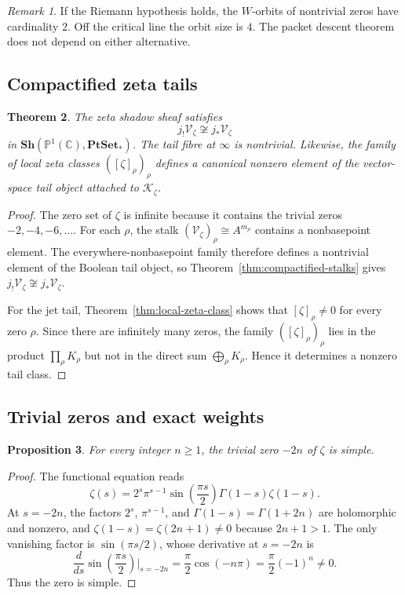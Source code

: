 \documentclass[11pt,a4paper]{article}
\newtheorem{theorem}{Theorem}[section]
\newtheorem{proposition}[theorem]{Proposition}
\theoremstyle{definition}
\theoremstyle{remark}
\newtheorem{remark}[theorem]{Remark}
\newcommand{\CC}{\mathbb C}
\newcommand{\PP}{\mathbb P}
\newcommand{\PtSet}{\mathbf{PtSet}_*}
\newcommand{\Vz}{\mathcal V_\zeta}
\newcommand{\Kz}{\mathcal K_\zeta}
\begin{document}
\begin{remark}
If the Riemann hypothesis holds, the $W$-orbits of nontrivial zeros have cardinality $2$. Off the critical line the orbit size is $4$. The packet descent theorem does not depend on either alternative.
\end{remark}

\subsection{Compactified zeta tails}

\begin{theorem}\label{thm:zeta-tail}
The zeta shadow sheaf satisfies
\[
j_!\Vz\not\cong j_*\Vz
\]
in $\mathbf{Sh}(\PP^1(\CC),\PtSet)$. The tail fibre at $\infty$ is nontrivial. Likewise, the family of local zeta classes $([\zeta]_\rho)_\rho$ defines a canonical nonzero element of the vector-space tail object attached to $\Kz$.
\end{theorem}

\begin{proof}
The zero set of $\zeta$ is infinite because it contains the trivial zeros $-2,-4,-6,\dots$. For each $\rho$, the stalk $(\Vz)_\rho\cong A^{m_\rho}$ contains a nonbasepoint element. The everywhere-nonbasepoint family therefore defines a nontrivial element of the Boolean tail object, so Theorem~\ref{thm:compactified-stalks} gives $j_!\Vz\not\cong j_*\Vz$.

For the jet tail, Theorem~\ref{thm:local-zeta-class} shows that $[\zeta]_\rho\neq0$ for every zero $\rho$. Since there are infinitely many zeros, the family $([\zeta]_\rho)_\rho$ lies in the product $\prod_\rho K_\rho$ but not in the direct sum $\bigoplus_\rho K_\rho$. Hence it determines a nonzero tail class.
\end{proof}

\subsection{Trivial zeros and exact weights}

\begin{proposition}\label{prop:trivial-simple}
For every integer $n\geq1$, the trivial zero $-2n$ of $\zeta$ is simple.
\end{proposition}

\begin{proof}
The functional equation reads
\[
\zeta(s)=2^s\pi^{s-1}\sin\!\left(\frac{\pi s}{2}\right)\Gamma(1-s)\zeta(1-s).
\]
At $s=-2n$, the factors $2^s$, $\pi^{s-1}$, and $\Gamma(1-s)=\Gamma(1+2n)$ are holomorphic and nonzero, and $\zeta(1-s)=\zeta(2n+1)\neq0$ because $2n+1>1$. The only vanishing factor is $\sin(\pi s/2)$, whose derivative at $s=-2n$ is
\[
\frac{d}{ds}\sin\!\left(\frac{\pi s}{2}\right)\Big|_{s=-2n}=\frac\pi2\cos(-n\pi)=\frac\pi2(-1)^n\neq0.
\]
Thus the zero is simple.
\end{proof}
\end{document}
